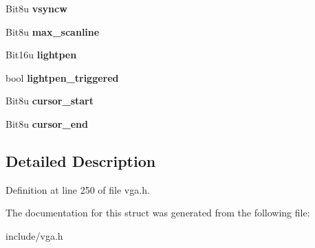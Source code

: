 \begin{DoxyCompactItemize}
\item 
\hypertarget{structVGA__OTHER_a6214860b81fc58e6a2b6712438cfdf87}{Bit8u {\bfseries vsyncw}}\label{structVGA__OTHER_a6214860b81fc58e6a2b6712438cfdf87}

\item 
\hypertarget{structVGA__OTHER_a5cda2fe9d1bbdb240fed75fbd4ebd54c}{Bit8u {\bfseries max\-\_\-scanline}}\label{structVGA__OTHER_a5cda2fe9d1bbdb240fed75fbd4ebd54c}

\item 
\hypertarget{structVGA__OTHER_aad2e4a57fdf43dd565398a1133880fe7}{Bit16u {\bfseries lightpen}}\label{structVGA__OTHER_aad2e4a57fdf43dd565398a1133880fe7}

\item 
\hypertarget{structVGA__OTHER_afdc8e6fe00dceb5d216a683d60e5c60d}{bool {\bfseries lightpen\-\_\-triggered}}\label{structVGA__OTHER_afdc8e6fe00dceb5d216a683d60e5c60d}

\item 
\hypertarget{structVGA__OTHER_ac1e5b1a383040b106970a2e96ffe7ba9}{Bit8u {\bfseries cursor\-\_\-start}}\label{structVGA__OTHER_ac1e5b1a383040b106970a2e96ffe7ba9}

\item 
\hypertarget{structVGA__OTHER_a15dd5380b25f09d7bd0e6eb8b8380cbe}{Bit8u {\bfseries cursor\-\_\-end}}\label{structVGA__OTHER_a15dd5380b25f09d7bd0e6eb8b8380cbe}

\end{DoxyCompactItemize}


\subsection{Detailed Description}


Definition at line 250 of file vga.\-h.



The documentation for this struct was generated from the following file\-:\begin{DoxyCompactItemize}
\item 
include/vga.\-h\end{DoxyCompactItemize}
